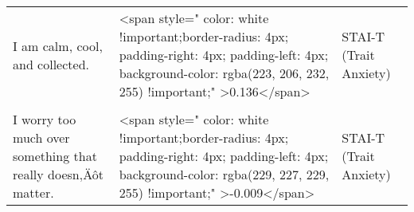 \documentclass[border=1mm]{standalone}
\begin{document}
\begin{longtable}{lll}
I am calm, cool, and collected. & <span style="     color: white !important;border-radius: 4px; padding-right: 4px; padding-left: 4px; background-color: rgba(223, 206, 232, 255) !important;" >0.136</span> & STAI-T (Trait Anxiety)\\
\cellcolor{gray!10}{I feel that difficulties are piling up so that I cannot overcome them.} & \cellcolor{gray!10}{<span style="     color: white !important;border-radius: 4px; padding-right: 4px; padding-left: 4px; background-color: rgba(225, 212, 231, 255) !important;" >0.097</span>} & \cellcolor{gray!10}{STAI-T (Trait Anxiety)}\\
I worry too much over something that really doesn‚Äôt matter. & <span style="     color: white !important;border-radius: 4px; padding-right: 4px; padding-left: 4px; background-color: rgba(229, 227, 229, 255) !important;" >-0.009</span> & STAI-T (Trait Anxiety)\\*
\end{longtable}
\end{document}
